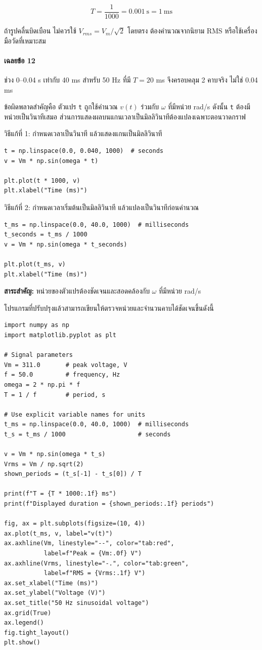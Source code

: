 \[
T=\frac{1}{1000}=0.001\ \mathrm{s}=1\ \mathrm{ms}
\]

ถ้ารูปคลื่นบิดเบือน ไม่ควรใช้ $V_{rms}=V_m/\sqrt{2}$ โดยตรง ต้องคำนวณจากนิยาม RMS หรือใช้เครื่องมือวัดที่เหมาะสม

\paragraph{เฉลยข้อ 12}

ช่วง 0–0.04 s เท่ากับ 40 ms สำหรับ 50 Hz ที่มี $T=20$ ms จึงครอบคลุม 2 คาบจริง ไม่ใช่ 0.04 ms

ข้อผิดพลาดสำคัญคือ ตัวแปร \texttt{t} ถูกใช้คำนวณ $v(t)$ ร่วมกับ $\omega$ ที่มีหน่วย rad/s ดังนั้น \texttt{t} ต้องมีหน่วยเป็นวินาทีเสมอ ส่วนการแสดงผลบนแกนเวลาเป็นมิลลิวินาทีต้องแปลงเฉพาะตอนวาดกราฟ

วิธีแก้ที่ 1: กำหนดเวลาเป็นวินาที แล้วแสดงแกนเป็นมิลลิวินาที

\begin{verbatim}
t = np.linspace(0.0, 0.040, 1000)  # seconds
v = Vm * np.sin(omega * t)

plt.plot(t * 1000, v)
plt.xlabel("Time (ms)")
\end{verbatim}

วิธีแก้ที่ 2: กำหนดเวลาเริ่มต้นเป็นมิลลิวินาที แล้วแปลงเป็นวินาทีก่อนคำนวณ

\begin{verbatim}
t_ms = np.linspace(0.0, 40.0, 1000)  # milliseconds
t_seconds = t_ms / 1000
v = Vm * np.sin(omega * t_seconds)

plt.plot(t_ms, v)
plt.xlabel("Time (ms)")
\end{verbatim}

\textbf{สาระสำคัญ:} หน่วยของตัวแปรต้องชัดเจนและสอดคล้องกับ $\omega$ ที่มีหน่วย rad/s

โปรแกรมที่ปรับปรุงแล้วสามารถเขียนให้ตรวจหน่วยและจำนวนคาบได้ชัดเจนขึ้นดังนี้

\begin{verbatim}
import numpy as np
import matplotlib.pyplot as plt

# Signal parameters
Vm = 311.0       # peak voltage, V
f = 50.0         # frequency, Hz
omega = 2 * np.pi * f
T = 1 / f        # period, s

# Use explicit variable names for units
t_ms = np.linspace(0.0, 40.0, 1000)  # milliseconds
t_s = t_ms / 1000                    # seconds

v = Vm * np.sin(omega * t_s)
Vrms = Vm / np.sqrt(2)
shown_periods = (t_s[-1] - t_s[0]) / T

print(f"T = {T * 1000:.1f} ms")
print(f"Displayed duration = {shown_periods:.1f} periods")

fig, ax = plt.subplots(figsize=(10, 4))
ax.plot(t_ms, v, label="v(t)")
ax.axhline(Vm, linestyle="--", color="tab:red",
           label=f"Peak = {Vm:.0f} V")
ax.axhline(Vrms, linestyle="-.", color="tab:green",
           label=f"RMS = {Vrms:.1f} V")
ax.set_xlabel("Time (ms)")
ax.set_ylabel("Voltage (V)")
ax.set_title("50 Hz sinusoidal voltage")
ax.grid(True)
ax.legend()
fig.tight_layout()
plt.show()
\end{verbatim}

